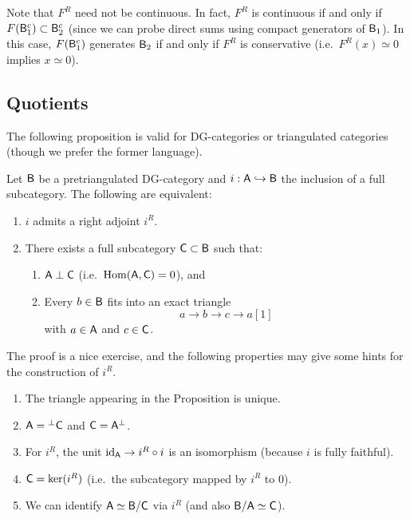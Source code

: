 \documentclass{amsart}
\begin{document}
\begin{rmk}
	Note that $F^R$ need not be continuous.
	In fact, $F^R$ is continuous if and only if $F(\mathsf{B}_1^c) \subset \mathsf{B}_2^c$ (since we can probe direct sums using compact generators of $\mathsf{B}_1$).
	In this case, $F(\mathsf{B}_1^c)$ generates $\mathsf{B}_2$ if and only if $F^R$ is conservative (i.e.\ $F^R(x) \simeq 0$ implies $x \simeq 0$).
\end{rmk}

\subsection{Quotients}

The following proposition is valid for DG-categories or triangulated categories (though we prefer the former language).

\begin{prop}
	Let $\mathsf{B}$ be a pretriangulated DG-category and $i: \mathsf{A} \hookrightarrow \mathsf{B}$ the inclusion of a full subcategory.
	The following are equivalent:
	\begin{enumerate}
		\item $i$ admits a right adjoint $i^R$.
		\item There exists a full subcategory $\mathsf{C} \subset \mathsf{B}$ such that:
			\begin{enumerate}
				\item $\mathsf{A} \perp \mathsf{C}$ (i.e.\ $\operatorname{Hom}(\mathsf{A}, \mathsf{C}) = 0$), and 
				\item Every $b \in \mathsf{B}$ fits into an exact triangle
				\[
					a \to b \to c \to a[1]
				\]
				with $a \in \mathsf{A}$ and $c \in \mathsf{C}$.
			\end{enumerate}
	\end{enumerate}
\end{prop}

The proof is a nice exercise, and the following properties may give some hints for the construction of $i^R$.

\begin{enumerate}
	\item The triangle appearing in the Proposition is unique.
	\item $\mathsf{A} = {}^\perp \mathsf{C}$ and $\mathsf{C} = \mathsf{A}^\perp$.
	\item For $i^R$, the unit $\operatorname{id}_{\mathsf{A}} \to i^R \circ i$ is an isomorphism (because $i$ is fully faithful).
	\item $\mathsf{C} = \ker(i^R)$ (i.e.\ the subcategory mapped by $i^R$ to $0$).
	\item We can identify $\mathsf{A} \simeq \mathsf{B} / \mathsf{C}$ via $i^R$ (and also $\mathsf{B} / \mathsf{A} \simeq \mathsf{C}$).
\end{enumerate}
\end{document}
